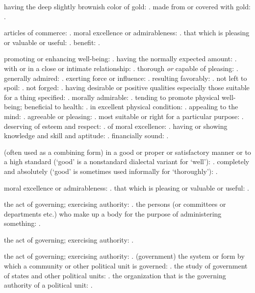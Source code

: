   having the deep slightly brownish color of gold: . made from or covered with gold: .

  articles of commerce: . moral excellence or admirableness: . that which is pleasing or valuable or useful: . benefit: .

  promoting or enhancing well-being: . having the normally expected amount: . with or in a close or intimate relationship: . thorough \textit{or} capable of pleasing: . generally admired: . exerting force or influence: . resulting favorably: . not left to spoil: . not forged: . having desirable or positive qualities especially those suitable for a thing specified: . morally admirable: . tending to promote physical well-being; beneficial to health: . in excellent physical condition: . appealing to the mind: . agreeable or pleasing: . most suitable or right for a particular purpose: . deserving of esteem and respect: . of moral excellence: . having or showing knowledge and skill and aptitude: . financially sound: .

  (often used as a combining form) in a good or proper or satisfactory manner or to a high standard (`good' is a nonstandard dialectal variant for `well'): . completely and absolutely (`good' is sometimes used informally for `thoroughly'): .

  moral excellence or admirableness: . that which is pleasing or valuable or useful: .

  the act of governing; exercising authority: . the persons (or committees or departments etc.) who make up a body for the purpose of administering something: .

  the act of governing; exercising authority: .

  the act of governing; exercising authority: . (government) the system or form by which a community or other political unit is governed: . the study of government of states and other political units: . the organization that is the governing authority of a political unit: .


